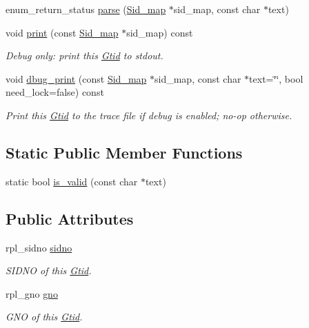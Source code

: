 \begin{DoxyCompactItemize}
enum\+\_\+return\+\_\+status \mbox{\hyperlink{structGtid_aac7d6a154262abb97af871d7f31aad42}{parse}} (\mbox{\hyperlink{classSid__map}{Sid\+\_\+map}} $\ast$sid\+\_\+map, const char $\ast$text)
\item 
\mbox{\label{structGtid_a19c1675f7c6ff9a21bdfdd0fd3a2f0f5}} 
void \mbox{\hyperlink{structGtid_a19c1675f7c6ff9a21bdfdd0fd3a2f0f5}{print}} (const \mbox{\hyperlink{classSid__map}{Sid\+\_\+map}} $\ast$sid\+\_\+map) const
\begin{DoxyCompactList}\small\item\em Debug only\+: print this \mbox{\hyperlink{structGtid}{Gtid}} to stdout. \end{DoxyCompactList}\item 
\mbox{\label{structGtid_a3ab329d122f4a333d20ee097156b5787}} 
void \mbox{\hyperlink{structGtid_a3ab329d122f4a333d20ee097156b5787}{dbug\+\_\+print}} (const \mbox{\hyperlink{classSid__map}{Sid\+\_\+map}} $\ast$sid\+\_\+map, const char $\ast$text=\char`\"{}\char`\"{}, bool need\+\_\+lock=false) const
\begin{DoxyCompactList}\small\item\em Print this \mbox{\hyperlink{structGtid}{Gtid}} to the trace file if debug is enabled; no-\/op otherwise. \end{DoxyCompactList}\end{DoxyCompactItemize}
\subsection*{Static Public Member Functions}
\begin{DoxyCompactItemize}
\item 
static bool \mbox{\hyperlink{structGtid_afaec04645d158bc4ad9eaa2199cc6951}{is\+\_\+valid}} (const char $\ast$text)
\end{DoxyCompactItemize}
\subsection*{Public Attributes}
\begin{DoxyCompactItemize}
\item 
\mbox{\label{structGtid_aad81c0dd59ff02412e507d254c6843d2}} 
rpl\+\_\+sidno \mbox{\hyperlink{structGtid_aad81c0dd59ff02412e507d254c6843d2}{sidno}}
\begin{DoxyCompactList}\small\item\em S\+I\+D\+NO of this \mbox{\hyperlink{structGtid}{Gtid}}. \end{DoxyCompactList}\item 
\mbox{\label{structGtid_a5e35a770a25f71eb749be34477bab48a}} 
rpl\+\_\+gno \mbox{\hyperlink{structGtid_a5e35a770a25f71eb749be34477bab48a}{gno}}
\begin{DoxyCompactList}\small\item\em G\+NO of this \mbox{\hyperlink{structGtid}{Gtid}}. \end{DoxyCompactList}\end{DoxyCompactItemize}
